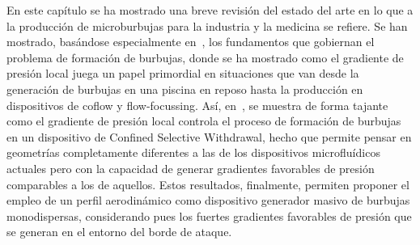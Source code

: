 En este capítulo se ha mostrado una breve revisión del estado del arte en lo que a la producción de microburbujas para la industria y la medicina se refiere. Se han mostrado, basándose especialmente en~\cite{Rodriguez-Rodriguez2015b}, los fundamentos que gobiernan el problema de formación de burbujas, donde se ha mostrado como el gradiente de presión local juega un papel primordial en situaciones que van desde la generación de burbujas en una piscina en reposo hasta la producción en dispositivos de coflow y flow-focussing. Así, en~\cite{Evangelio2015b}, se muestra de forma tajante como el gradiente de presión local controla el proceso de formación de burbujas en un dispositivo de Confined Selective Withdrawal, hecho 	que permite pensar en geometrías completamente diferentes a las de los dispositivos microfluídicos actuales pero con la capacidad de generar gradientes favorables de presión comparables a los de aquellos. Estos resultados, finalmente, permiten proponer el empleo de un perfil aerodinámico como dispositivo generador masivo de burbujas monodispersas, considerando pues los fuertes gradientes favorables de presión que se generan en el entorno del borde de ataque. 